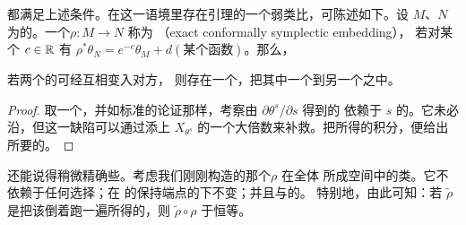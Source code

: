 都满足上述条件。在这一语境里存在\trMoser{}引理的一个弱类比，可陈述如下。设 $M$、$N$
为\trCorneredBoundary{}的\trExactSymplectic\trManifold。一个\trEmbedding{}$\rho\colon M\to N$ 称为%
\textbf{\trExact\trConformallySymplectic{}\trEmbedding}（exact conformally symplectic embedding），
若对某个 $c\in\mathbb{R}$ 有 $\rho^*\theta_N=e^{-c}\theta_M+d(\text{某个函数})$。那么，
\begin{lemma}\label{thm:moser-deformation-embedding}
若两个\trCorneredBoundary{}的\trExactSymplectic\trManifold{}可经\trDeformation{}互相变入对方，
则存在一个\trExact\trConformallySymplectic{}\trEmbedding，把其中一个\trEmbedding{}到另一个之中。
\end{lemma}
\begin{proof}
取一个\trDeformation，并如标准的\trMoser{}论证那样，考察由 $\partial\theta^s/\partial s$ 得到的%
依赖于 $s$ 的\trVectorField。它未必沿\trBoundaryFace\trIncoming，但这一缺陷可以通过添上 $X_{\theta^s}$
的一个大倍数来补救。把所得的\trVectorField{}积分，便给出所要的\trEmbedding。
\end{proof}
还能说得稍微精确些。考虑我们刚刚构造的那个\trEmbedding{}$\rho$ 在全体%
\trExact\trConformallySymplectic{}\trEmbedding{}所成空间中的\trIsotopy{}类。它不依赖于任何选择；在%
\trDeformation{}的保持端点的\trHomotopy{}下不变；并且与\trDeformation{}的\trComposition{}\trCompatible。
特别地，由此可知：若 $\widetilde{\rho}$ 是把该\trDeformation{}倒着跑一遍所得的\trEmbedding，则%
$\widetilde{\rho}\circ\rho$ \trIsotopy{}于恒等。
